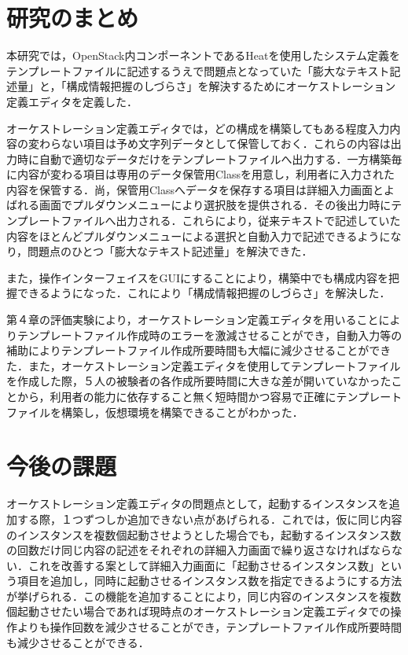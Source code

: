 \documentclass[mingoth]{kut-paper}		%
\begin{document}
	\section{研究のまとめ}
	本研究では，OpenStack内コンポーネントであるHeatを使用したシステム定義をテンプレートファイルに記述するうえで問題点となっていた「膨大なテキスト記述量」と，「構成情報把握のしづらさ」を解決するためにオーケストレーション定義エディタを定義した．
	
	オーケストレーション定義エディタでは，どの構成を構築してもある程度入力内容の変わらない項目は予め文字列データとして保管しておく．これらの内容は出力時に自動で適切なデータだけをテンプレートファイルへ出力する．一方構築毎に内容が変わる項目は専用のデータ保管用Classを用意し，利用者に入力された内容を保管する．尚，保管用Classへデータを保存する項目は詳細入力画面とよばれる画面でプルダウンメニューにより選択肢を提供される．その後出力時にテンプレートファイルへ出力される．これらにより，従来テキストで記述していた内容をほとんどプルダウンメニューによる選択と自動入力で記述できるようになり，問題点のひとつ「膨大なテキスト記述量」を解決できた．
	
	また，操作インターフェイスをGUIにすることにより，構築中でも構成内容を把握できるようになった．これにより「構成情報把握のしづらさ」を解決した．
	
	第４章の評価実験により，オーケストレーション定義エディタを用いることによりテンプレートファイル作成時のエラーを激減させることができ，自動入力等の補助によりテンプレートファイル作成所要時間も大幅に減少させることができた．また，オーケストレーション定義エディタを使用してテンプレートファイルを作成した際，５人の被験者の各作成所要時間に大きな差が開いていなかったことから，利用者の能力に依存すること無く短時間かつ容易で正確にテンプレートファイルを構築し，仮想環境を構築できることがわかった．
	\section{今後の課題}
	オーケストレーション定義エディタの問題点として，起動するインスタンスを追加する際，１つずつしか追加できない点があげられる．これでは，仮に同じ内容のインスタンスを複数個起動させようとした場合でも，起動するインスタンス数の回数だけ同じ内容の記述をそれぞれの詳細入力画面で繰り返さなければならない．これを改善する案として詳細入力画面に「起動させるインスタンス数」という項目を追加し，同時に起動させるインスタンス数を指定できるようにする方法が挙げられる．この機能を追加することにより，同じ内容のインスタンスを複数個起動させたい場合であれば現時点のオーケストレーション定義エディタでの操作よりも操作回数を減少させることができ，テンプレートファイル作成所要時間も減少させることができる．
	
\end{document}
